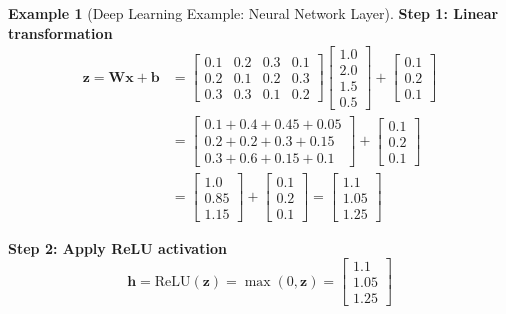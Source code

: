 \documentclass[12pt,a4paper]{article}
\theoremstyle{definition}
\newtheorem{example}{Example}[section]
\begin{document}
\begin{example}[Deep Learning Example: Neural Network Layer]
\textbf{Step 1: Linear transformation}
\begin{align}
\mathbf{z} = \mathbf{W}\mathbf{x} + \mathbf{b} &= \begin{bmatrix}
0.1 & 0.2 & 0.3 & 0.1 \\
0.2 & 0.1 & 0.2 & 0.3 \\
0.3 & 0.3 & 0.1 & 0.2
\end{bmatrix} \begin{bmatrix} 1.0 \\ 2.0 \\ 1.5 \\ 0.5 \end{bmatrix} + \begin{bmatrix} 0.1 \\ 0.2 \\ 0.1 \end{bmatrix} \\
&= \begin{bmatrix}
0.1 + 0.4 + 0.45 + 0.05 \\
0.2 + 0.2 + 0.3 + 0.15 \\
0.3 + 0.6 + 0.15 + 0.1
\end{bmatrix} + \begin{bmatrix} 0.1 \\ 0.2 \\ 0.1 \end{bmatrix} \\
&= \begin{bmatrix} 1.0 \\ 0.85 \\ 1.15 \end{bmatrix} + \begin{bmatrix} 0.1 \\ 0.2 \\ 0.1 \end{bmatrix} = \begin{bmatrix} 1.1 \\ 1.05 \\ 1.25 \end{bmatrix}
\end{align}

\textbf{Step 2: Apply ReLU activation}
\begin{equation}
\mathbf{h} = \text{ReLU}(\mathbf{z}) = \max(0, \mathbf{z}) = \begin{bmatrix} 1.1 \\ 1.05 \\ 1.25 \end{bmatrix}
\end{equation}


\end{example}
\end{document}
